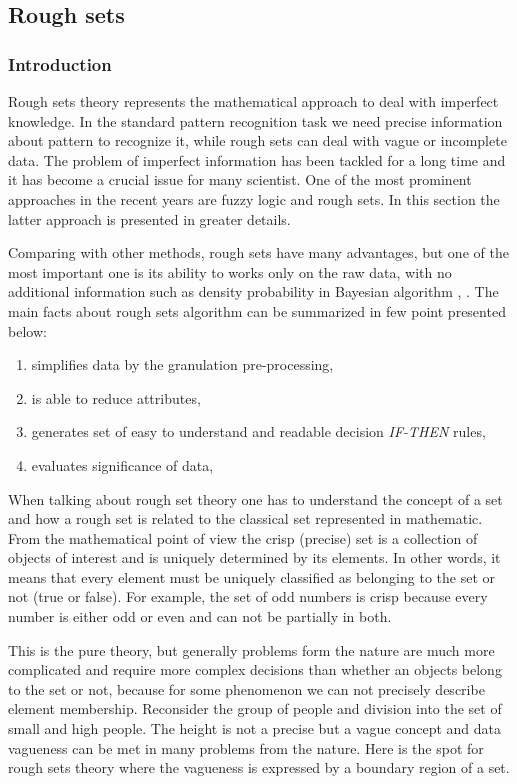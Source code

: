 \subsection{Rough sets}
\label{cha:Rough_set}
\subsubsection{Introduction}
\label{cha:Rough_set_introduction}
Rough sets theory represents the mathematical approach to deal with imperfect knowledge. 
In the standard pattern recognition task we need precise information about
pattern to recognize it, while rough sets can deal with vague or incomplete data. The problem of imperfect 
information has been tackled for a long time and it has become a crucial issue for many scientist.
One of the most prominent approaches in the recent years are fuzzy logic and rough sets.
In this section the latter approach is presented in greater details. 

Comparing with other methods, rough sets have many advantages, but one of the most important
one is its ability to works only on the raw data, with no additional information such 
as density probability in Bayesian algorithm \cite{bib38}, \cite{bib14}. The main facts about rough sets
algorithm can be summarized in few point presented below:
\begin{enumerate}
    \item simplifies data by the granulation pre-processing,
    \item is able to reduce attributes,
    \item generates set of easy to understand and readable decision
        \textit{IF-THEN} rules,
    \item evaluates significance of data,
\end{enumerate}

When talking about rough set theory one has to understand the concept of a set 
and how a rough set is related to the classical set represented in mathematic.
From the mathematical point of view the crisp (precise) set is a collection of 
objects of interest and is uniquely determined by its elements. In other words,
it means that every element must be uniquely classified as belonging to the set 
or not (true or false). For example, the set of odd numbers is crisp because every
number is either odd or even and can not be partially in both. 

This is the pure theory, but generally problems form the nature are much more
complicated and require more complex decisions than whether an objects belong to
the set or not, because for some phenomenon we can not precisely describe element
membership. Reconsider the group of people and division into the set of small and
high people. The height is not a precise but a vague concept and data vagueness can 
be met in many problems from the nature. Here is the spot for rough sets
theory where the vagueness is expressed by a boundary region of a set. 

